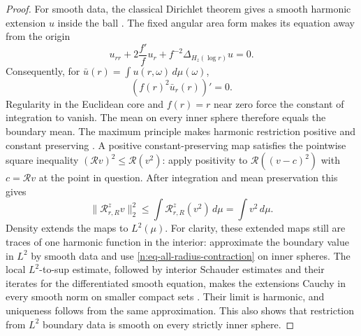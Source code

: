 \begin{proof}
For smooth data, the classical Dirichlet theorem gives a smooth harmonic
extension \(u\) inside the ball
\cite[Theorem~6.14, p.~107]{GilbargTrudinger}.  The fixed angular area
form makes its equation away from the origin
\[
 u_{rr}+2\frac{f'}f u_r+f^{-2}\Delta_{H_z(\log r)}u=0.
\]
Consequently, for \(\bar u(r)=\int u(r,\omega)\,d\mu(\omega)\),
\[
 (f(r)^2\bar u_r(r))'=0.
\]
Regularity in the Euclidean core and \(f(r)=r\) near zero force the constant
of integration to vanish.  The mean on every inner sphere therefore equals
the boundary mean.  The maximum principle makes harmonic restriction
positive and constant preserving
\cite[Theorems~3.1 and~3.3, pp.~32--33]{GilbargTrudinger}.
A positive constant-preserving map
satisfies the pointwise square inequality
\((\mathcal R v)^2\leq\mathcal R(v^2)\): apply positivity to
\(\mathcal R((v-c)^2)\) with \(c=\mathcal Rv\) at the point in question.
After integration and mean preservation this gives
\begin{equation}
 \|\mathcal R^z_{r,R}v\|_2^2
 \leq\int\mathcal R^z_{r,R}(v^2)\,d\mu
 =\int v^2\,d\mu.
 \label{n:eq-all-radius-contraction}
\end{equation}
Density extends the maps to \(L^2(\mu)\).  For clarity, these extended maps
still are traces of one harmonic function in the interior: approximate the
boundary value in \(L^2\) by smooth data and use
\eqref{n:eq-all-radius-contraction} on inner spheres.  The local
\(L^2\)-to-sup estimate, followed by interior Schauder estimates and their
iterates for the differentiated smooth equation, makes the extensions
Cauchy in every smooth norm on smaller compact sets
\cite[Theorem~8.17, p.~194, with \(p=2\), and Corollary~6.3,
pp.~93--94]{GilbargTrudinger}.  Their limit is harmonic, and uniqueness
follows from the same approximation.
This also shows that restriction from \(L^2\) boundary data is smooth on
every strictly inner sphere.


\end{proof}
